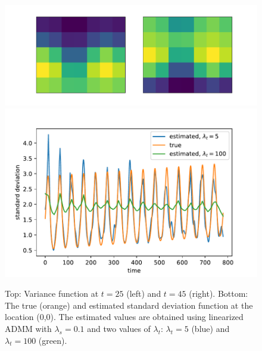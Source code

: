 \documentclass[letterpaper]{article} %
\begin{document}
\begin{figure}[tb]
  \centering	
  \includegraphics[height=.1\textheight]{Figures/true_var_spatial}\\
  \includegraphics[height=.15\textheight]{Figures/true_fitted_var}
  \caption{Top: Variance function at $t=25$ (left) and $t=45$
    (right). Bottom: The true (orange) and estimated standard deviation 
    function at the location (0,0). The estimated values are
    obtained using linearized ADMM with $\lambda_s=0.1$ and two
    values of $\lambda_t$: $\lambda_t=5$ (blue) and
    $\lambda_t=100$ (green).} \label{fig:true_var_spatial}
\end{figure}
\end{document}
